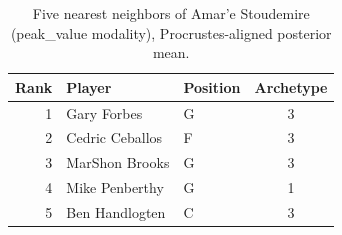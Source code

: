 \begin{table}[htbp]
  \centering\small
  \begin{tabular}{rllc}
    \toprule
    Rank & Player & Position & Archetype \\
    \midrule
    1 & Gary Forbes & G & 3 \\
    2 & Cedric Ceballos & F & 3 \\
    3 & MarShon Brooks & G & 3 \\
    4 & Mike Penberthy & G & 1 \\
    5 & Ben Handlogten & C & 3 \\
    \bottomrule
  \end{tabular}
  \caption{Five nearest neighbors of Amar'e Stoudemire (peak_value modality), Procrustes-aligned posterior mean.}
  \label{tab:Amar_e_Stoudemire_neighbors_peak_value}
\end{table}

